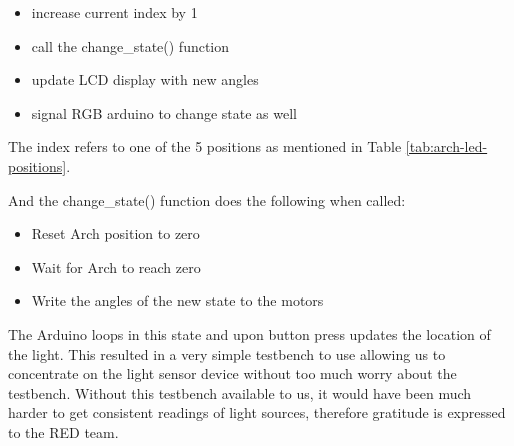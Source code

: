 \begin{itemize}
  \item increase current index by 1
  \item call the change\_state() function 
  \item update LCD display with new angles
  \item signal RGB arduino to change state as well
\end{itemize}

The index refers to one of the 5 positions as mentioned in Table \ref{tab:arch-led-positions}. 

And the change\_state() function does the following when called:
\begin{itemize}
  \item Reset Arch position to zero
  \item Wait for Arch to reach zero
  \item Write the angles of the new state to the motors
\end{itemize}

The Arduino loops in this state and upon button press updates the location of the light. This resulted in a very simple testbench to use allowing us to concentrate on the light sensor device without too much worry about the testbench. Without this testbench available to us, it would have been much harder to get consistent readings of light sources, therefore gratitude is expressed to the RED team.

%
